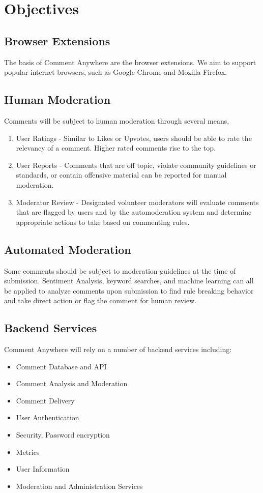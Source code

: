 \documentclass[proposal.tex]{subfiles}
\begin{document}
    
\section{Objectives}

\subsection{Browser Extensions}

The basis of Comment Anywhere are the browser extensions. 
We aim to support popular internet browsers, such as Google Chrome and Mozilla Firefox.

\subsection{Human Moderation}

Comments will be subject to human moderation through several means.

\begin{enumerate}
    \item User Ratings - Similar to Likes or Upvotes, users should be able to rate the relevancy of a comment. Higher rated comments rise to the top.
    \item User Reports - Comments that are off topic, violate community guidelines or standards, or contain offensive material can be reported for manual moderation.
    \item Moderator Review - Designated volunteer moderators will evaluate comments that are flagged by users and by the automoderation system and determine appropriate actions to take based on commenting rules.
\end{enumerate}

\subsection{Automated Moderation}

Some comments should be subject to moderation guidelines at the time of submission.
Sentiment Analysis, keyword searches, and machine learning can all be applied to analyze comments upon submission to find rule breaking behavior and take direct action or flag the comment for human review.

\subsection{Backend Services}

Comment Anywhere will rely on a number of backend services including:

\begin{itemize}
    \item Comment Database and API
    \item Comment Analysis and Moderation
    \item Comment Delivery
    \item User Authentication
    \item Security, Password encryption
    \item Metrics
    \item User Information
    \item Moderation and Administration Services
\end{itemize}
\end{document}
